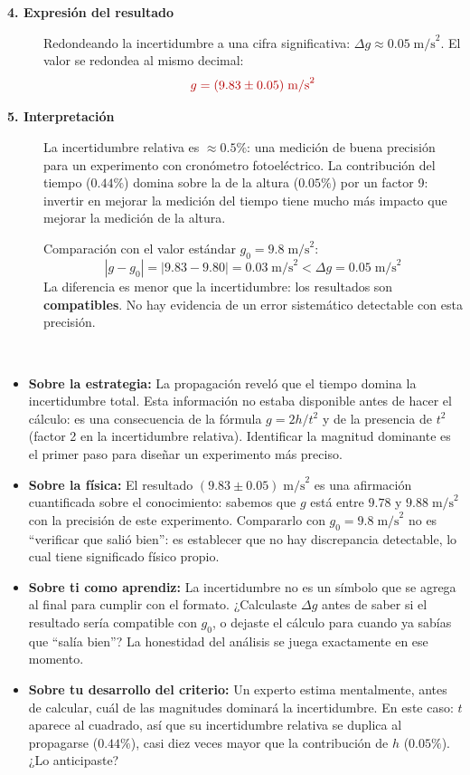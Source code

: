 \documentclass[11pt]{book}
\newcommand{\incog}[1]{\textcolor{colIncog}{#1}}
\begin{document}
\begin{enumerate}
\begin{description}
\begin{description}
    \item[\textbf{4. Expresión del resultado}]
    Redondeando la incertidumbre a una cifra significativa: $\Delta g \approx 0.05\;\text{m/s}^2$. El valor se redondea al mismo decimal:
    \[
        \incog{g = (9.83 \pm 0.05)\;\text{m/s}^2}
    \]

    \item[\textbf{5. Interpretación}]
    La incertidumbre relativa es $\approx 0.5\%$: una medición de buena precisión para un experimento con cronómetro fotoeléctrico. La contribución del tiempo ($0.44\%$) domina sobre la de la altura ($0.05\%$) por un factor 9: invertir en mejorar la medición del tiempo tiene mucho más impacto que mejorar la medición de la altura.

    Comparación con el valor estándar $g_0 = 9.8\;\text{m/s}^2$:
    \[
        |g - g_0| = |9.83 - 9.80| = 0.03\;\text{m/s}^2 < \Delta g = 0.05\;\text{m/s}^2
    \]
    La diferencia es menor que la incertidumbre: los resultados son {\bf compatibles}. No hay evidencia de un error sistemático detectable con esta precisión.
\end{description}

\item[Reflexionar]~
\begin{itemize}
    \item {\bf Sobre la estrategia:} La propagación reveló que el tiempo domina la incertidumbre total. Esta información no estaba disponible antes de hacer el cálculo: es una consecuencia de la fórmula $g = 2h/t^2$ y de la presencia de $t^2$ (factor 2 en la incertidumbre relativa). Identificar la magnitud dominante es el primer paso para diseñar un experimento más preciso.
    \item {\bf Sobre la física:} El resultado $(9.83 \pm 0.05)\;\text{m/s}^2$ es una afirmación cuantificada sobre el conocimiento: sabemos que $g$ está entre $9.78$ y $9.88\;\text{m/s}^2$ con la precisión de este experimento. Compararlo con $g_0 = 9.8\;\text{m/s}^2$ no es ``verificar que salió bien'': es establecer que no hay discrepancia detectable, lo cual tiene significado físico propio.
    \item {\bf Sobre ti como aprendiz:} La incertidumbre no es un símbolo que se agrega al final para cumplir con el formato. ¿Calculaste $\Delta g$ antes de saber si el resultado sería compatible con $g_0$, o dejaste el cálculo para cuando ya sabías que ``salía bien''? La honestidad del análisis se juega exactamente en ese momento.
    \item {\bf Sobre tu desarrollo del criterio:} Un experto estima mentalmente, antes de calcular, cuál de las magnitudes dominará la incertidumbre. En este caso: $t$ aparece al cuadrado, así que su incertidumbre relativa se duplica al propagarse ($0.44\%$), casi diez veces mayor que la contribución de $h$ ($0.05\%$). ¿Lo anticipaste?
\end{itemize}


\end{description}
\end{enumerate}
\end{document}
